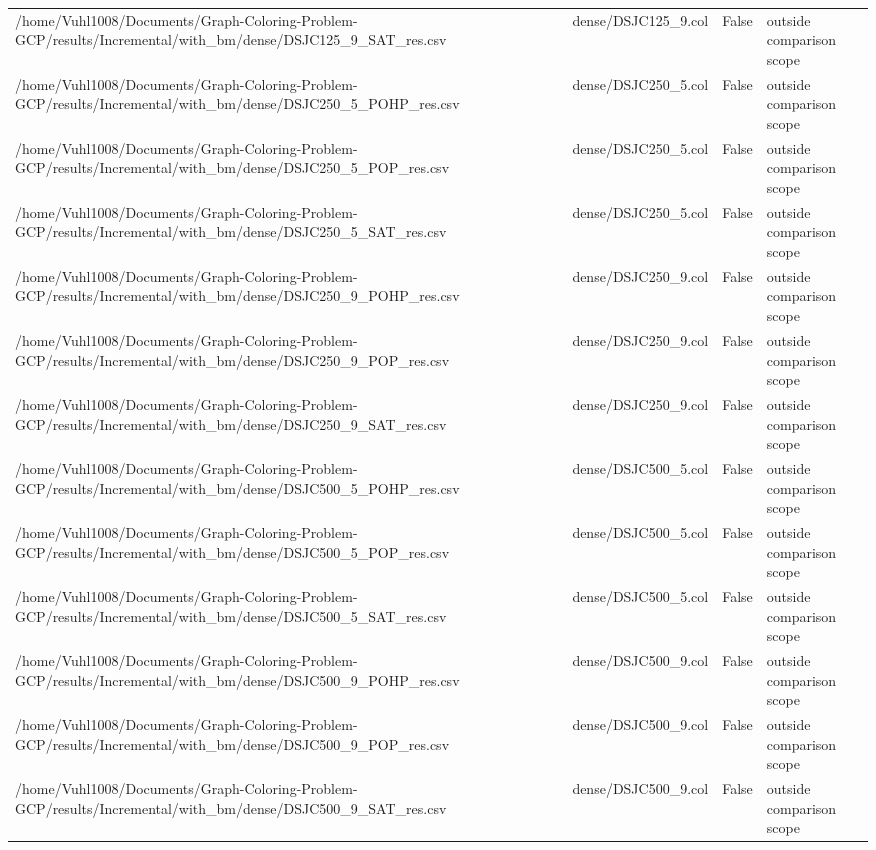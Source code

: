 \begin{table}[htbp]
\begin{tabular}{llll}
/home/Vuhl1008/Documents/Graph-Coloring-Problem-GCP/results/Incremental/with\_bm/dense/DSJC125\_9\_SAT\_res.csv & dense/DSJC125\_9.col & False & outside comparison scope \\
/home/Vuhl1008/Documents/Graph-Coloring-Problem-GCP/results/Incremental/with\_bm/dense/DSJC250\_5\_POHP\_res.csv & dense/DSJC250\_5.col & False & outside comparison scope \\
/home/Vuhl1008/Documents/Graph-Coloring-Problem-GCP/results/Incremental/with\_bm/dense/DSJC250\_5\_POP\_res.csv & dense/DSJC250\_5.col & False & outside comparison scope \\
/home/Vuhl1008/Documents/Graph-Coloring-Problem-GCP/results/Incremental/with\_bm/dense/DSJC250\_5\_SAT\_res.csv & dense/DSJC250\_5.col & False & outside comparison scope \\
/home/Vuhl1008/Documents/Graph-Coloring-Problem-GCP/results/Incremental/with\_bm/dense/DSJC250\_9\_POHP\_res.csv & dense/DSJC250\_9.col & False & outside comparison scope \\
/home/Vuhl1008/Documents/Graph-Coloring-Problem-GCP/results/Incremental/with\_bm/dense/DSJC250\_9\_POP\_res.csv & dense/DSJC250\_9.col & False & outside comparison scope \\
/home/Vuhl1008/Documents/Graph-Coloring-Problem-GCP/results/Incremental/with\_bm/dense/DSJC250\_9\_SAT\_res.csv & dense/DSJC250\_9.col & False & outside comparison scope \\
/home/Vuhl1008/Documents/Graph-Coloring-Problem-GCP/results/Incremental/with\_bm/dense/DSJC500\_5\_POHP\_res.csv & dense/DSJC500\_5.col & False & outside comparison scope \\
/home/Vuhl1008/Documents/Graph-Coloring-Problem-GCP/results/Incremental/with\_bm/dense/DSJC500\_5\_POP\_res.csv & dense/DSJC500\_5.col & False & outside comparison scope \\
/home/Vuhl1008/Documents/Graph-Coloring-Problem-GCP/results/Incremental/with\_bm/dense/DSJC500\_5\_SAT\_res.csv & dense/DSJC500\_5.col & False & outside comparison scope \\
/home/Vuhl1008/Documents/Graph-Coloring-Problem-GCP/results/Incremental/with\_bm/dense/DSJC500\_9\_POHP\_res.csv & dense/DSJC500\_9.col & False & outside comparison scope \\
/home/Vuhl1008/Documents/Graph-Coloring-Problem-GCP/results/Incremental/with\_bm/dense/DSJC500\_9\_POP\_res.csv & dense/DSJC500\_9.col & False & outside comparison scope \\
/home/Vuhl1008/Documents/Graph-Coloring-Problem-GCP/results/Incremental/with\_bm/dense/DSJC500\_9\_SAT\_res.csv & dense/DSJC500\_9.col & False & outside comparison scope \\

\end{tabular}
\end{table}
